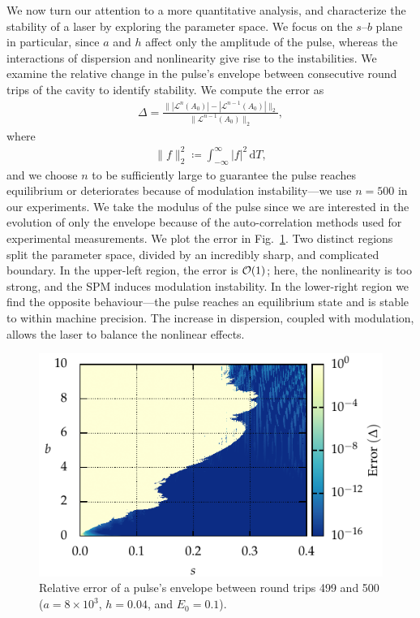 \documentclass[9pt,twocolumn,twoside]{osajnl}
\let\originalleft\left
\let\originalright\right
\renewcommand{\left}{\mathopen{}\mathclose\bgroup\originalleft}
\renewcommand{\right}{\aftergroup\egroup\originalright}
\providecommand{\df}{\textrm{d}} %
\providecommand{\bigO}[1]{\ensuremath{\mathop{}\mathopen{}\mathcal{O}\mathopen{}\left(#1\right)}} %
\begin{document}
We now turn our attention to a more quantitative analysis, and characterize the stability of a laser by exploring the parameter space. We focus on the $s$--$b$ plane in particular, since $a$ and $h$ affect only the amplitude of the pulse, whereas the interactions of dispersion and nonlinearity give rise to the instabilities. We examine the relative change in the pulse's envelope between consecutive round trips of the cavity to identify stability. We compute the error as
\begin{align}
	\Delta = \frac{\| |\mathcal{L}^n(A_0)| - |\mathcal{L}^{n-1}(A_0)| \|_2}{\| \mathcal{L}^{n-1}(A_0) \|_2},
	\label{eq:error}
\end{align}
where
\begin{align}
	\| f \|_2^2 \coloneqq \int_{-\infty}^\infty |f|^2 \, \df T,
\end{align}
and we choose $n$ to be sufficiently large to guarantee the pulse reaches equilibrium or deteriorates because of modulation instability---we use $n = 500$ in our experiments. We take the modulus of the pulse since we are interested in the evolution of only the envelope because of the auto-correlation methods used for experimental measurements. We plot the error in Fig.~\ref{fig:error}. Two distinct regions split the parameter space, divided by an incredibly sharp, and complicated boundary. In the upper-left region, the error is $\bigO{1}$; here, the nonlinearity is too strong, and the SPM induces modulation instability. In the lower-right region we find the opposite behaviour---the pulse reaches an equilibrium state and is stable to within machine precision. The increase in dispersion, coupled with modulation, allows the laser to balance the nonlinear effects. 

\begin{figure}[tbp]
	\centering
	\includegraphics{Figures/ParamSpaceErr}
	\caption{Relative error of a pulse's envelope between round trips 499 and 500 ($a = 8 \times 10^3$, $h = 0.04$, and $E_0 = 0.1$).}
	\label{fig:error}
\end{figure}
\end{document}
